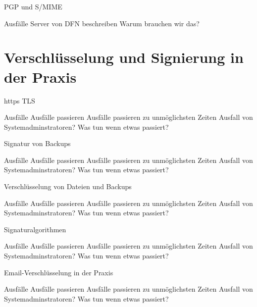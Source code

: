 \documentclass[10pt]{beamer}
\begin{document}
\begin{frame}[fragile]{PGP und S/MIME}
\begin{alertblock}{Ausfälle}
	Server von DFN beschreiben
	Warum brauchen wir das?
\end{alertblock}
\end{frame}

\section{Verschlüsselung und Signierung in der Praxis}

\begin{frame}[fragile]{https TLS}
\begin{alertblock}{Ausfälle}
	Ausfälle passieren
	Ausfälle passieren zu unmöglichsten Zeiten
	Ausfall von Systemadminstratoren?
	Was tun wenn etwas passiert?
\end{alertblock}
\end{frame}

\begin{frame}[fragile]{Signatur von Backups}
\begin{alertblock}{Ausfälle}
	Ausfälle passieren
	Ausfälle passieren zu unmöglichsten Zeiten
	Ausfall von Systemadminstratoren?
	Was tun wenn etwas passiert?
\end{alertblock}
\end{frame}

\begin{frame}[fragile]{Verschlüsselung von Dateien und Backups}
\begin{alertblock}{Ausfälle}
	Ausfälle passieren
	Ausfälle passieren zu unmöglichsten Zeiten
	Ausfall von Systemadminstratoren?
	Was tun wenn etwas passiert?
\end{alertblock}
\end{frame}

\begin{frame}[fragile]{Signaturalgorithmen}
\begin{alertblock}{Ausfälle}
	Ausfälle passieren
	Ausfälle passieren zu unmöglichsten Zeiten
	Ausfall von Systemadminstratoren?
	Was tun wenn etwas passiert?
\end{alertblock}
\end{frame}

\begin{frame}[fragile]{Email-Verschlüsselung in der Praxis}
\begin{alertblock}{Ausfälle}
	Ausfälle passieren
	Ausfälle passieren zu unmöglichsten Zeiten
	Ausfall von Systemadminstratoren?
	Was tun wenn etwas passiert?
\end{alertblock}
\end{frame}
\end{document}

